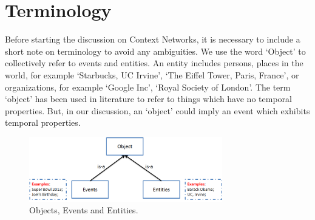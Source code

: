 \section{Terminology}
Before starting the discussion on Context Networks, it is necessary to include a short note on terminology to avoid any ambiguities. We use the word `Object' to collectively refer to events and entities. An entity includes persons, places in the world, for example `Starbucks, UC Irvine', `The Eiffel Tower, Paris, France', or organizations, for example `Google Inc', `Royal Society of London'. The term `object' has been used in literature to refer to things which have no temporal properties. But, in our discussion, an `object' could imply an event which exhibits temporal properties.

\begin{figure}[h]
\centering
\includegraphics[width=0.75\textwidth]{media/chapter1/terminology.png}
\caption{Objects, Events and Entities.}
\label{fig:terminology}
\end{figure}
